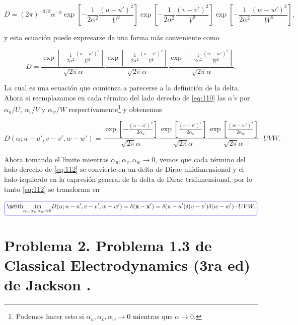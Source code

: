 \documentclass[a4paper,11pt]{article}
\makeatletter
\numberwithin{equation}{section}
\newcommand*{\boxcolor}{blue}
\renewcommand{\boxed}[1]{\textcolor{\boxcolor}{%
\tikz[baseline={([yshift=-1ex]current bounding box.center)}] \node [rectangle, minimum width=1ex,rounded corners,draw] {\normalcolor\m@th$\displaystyle#1$};}}
\makeatother
\begin{document}
\begin{equation*}
 D = (2\pi)^{-3/2}\alpha^{-3}
 \exp\left[-\frac{1}{2\alpha^2}\frac{(u - u')^2}{U^2}\right]
 \exp\left[-\frac{1}{2\alpha^2}\frac{(v-v')^2}{V^2}\right]
 \exp\left[-\frac{1}{2\alpha^2}\frac{(w-w')^2}{W^2}\right],
\end{equation*}

y esta ecuación puede expresarse de una forma más conveniente como 

\begin{equation}
 D = \frac{\exp\left[-\frac{1}{2\alpha^2}\frac{(u - u')^2}{U^2}\right]}{\sqrt{2\pi}\alpha}
 \frac{\exp\left[-\frac{1}{2\alpha^2}\frac{(v-v')^2}{V^2}\right]}{\sqrt{2\pi}\alpha}
 \frac{\exp\left[-\frac{1}{2\alpha^2}\frac{(w-w')^2}{W^2}\right]}{\sqrt{2\pi}\alpha}.
\label{eq:110}
\end{equation}

La cual es una ecuación que comienza a parecerse a la definición de la delta. Ahora 
si reemplazamos en cada término del lado derecho de \eqref{eq:110} las $\alpha$'s 
por $\alpha_u/U$, $\alpha_v/V$ y $\alpha_w/W$ respectivamente\footnote{Podemos 
hacer esto si $\alpha_u,\alpha_v,\alpha_w \rightarrow 0$ mientras que 
$\alpha \rightarrow 0$.} y obtenemos 

\begin{equation}
 D(\alpha;u-u',v-v',w-w') = \frac{\exp\left[-\frac{(u - u')^2}{2\alpha_u}\right]}{\sqrt{2\pi}\alpha}
 \frac{\exp\left[\frac{(v-v')^2}{2\alpha_v}\right]}{\sqrt{2\pi}\alpha}
 \frac{\exp\left[\frac{(w-w')^2}{2\alpha_w}\right]}{\sqrt{2\pi}\alpha}\cdot UVW.
 \label{eq:112}
\end{equation}

Ahora tomando el límite mientras $\alpha_u,\alpha_v,\alpha_w \rightarrow 0$, 
vemos que cada término del lado derecho de \eqref{eq:112} se convierte en un 
delta de Dirac unidimensional y el lado izquierdo en la expresión 
general de la delta de Dirac tridimensional, por lo tanto \eqref{eq:112} se 
transforma en 

\begin{equation*}
 \boxed{\underset{\alpha_u,\alpha_v,\alpha_w \rightarrow 0}{\text{lím}} 
 D(\alpha;u-u',v-v',w-w') = \delta(\mathbf{x} - \mathbf{x}') = 
 \delta(u - u')\delta(v - v')\delta(w - w')\cdot UVW.}
\end{equation*}

\newpage

\section{Problema 2. Problema 1.3 de Classical Electrodynamics (3ra ed) de 
Jackson \cite{jackson}.}
\end{document}
